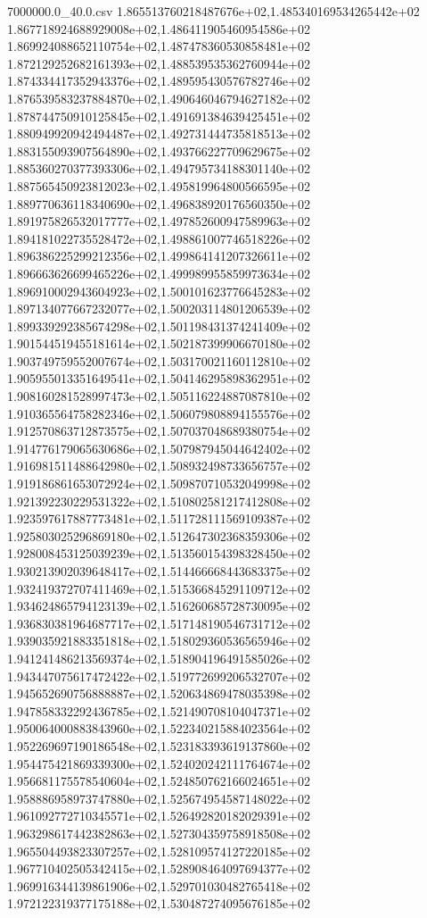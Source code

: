 \begin{filecontents*}{7000000.0_40.0.csv}
1.865513760218487676e+02,1.485340169534265442e+02
1.867718924688929008e+02,1.486411905460954586e+02
1.869924088652110754e+02,1.487478360530858481e+02
1.872129252682161393e+02,1.488539535362760944e+02
1.874334417352943376e+02,1.489595430576782746e+02
1.876539583237884870e+02,1.490646046794627182e+02
1.878744750910125845e+02,1.491691384639425451e+02
1.880949920942494487e+02,1.492731444735818513e+02
1.883155093907564890e+02,1.493766227709629675e+02
1.885360270377393306e+02,1.494795734188301140e+02
1.887565450923812023e+02,1.495819964800566595e+02
1.889770636118340690e+02,1.496838920176560350e+02
1.891975826532017777e+02,1.497852600947589963e+02
1.894181022735528472e+02,1.498861007746518226e+02
1.896386225299212356e+02,1.499864141207326611e+02
1.896663626699465226e+02,1.499989955859973634e+02
1.896910002943604923e+02,1.500101623776645283e+02
1.897134077667232077e+02,1.500203114801206539e+02
1.899339292385674298e+02,1.501198431374241409e+02
1.901544519455181614e+02,1.502187399906670180e+02
1.903749759552007674e+02,1.503170021160112810e+02
1.905955013351649541e+02,1.504146295898362951e+02
1.908160281528997473e+02,1.505116224887087810e+02
1.910365564758282346e+02,1.506079808894155576e+02
1.912570863712873575e+02,1.507037048689380754e+02
1.914776179065630686e+02,1.507987945044642402e+02
1.916981511488642980e+02,1.508932498733656757e+02
1.919186861653072924e+02,1.509870710532049998e+02
1.921392230229531322e+02,1.510802581217412808e+02
1.923597617887773481e+02,1.511728111569109387e+02
1.925803025296869180e+02,1.512647302368359306e+02
1.928008453125039239e+02,1.513560154398328450e+02
1.930213902039648417e+02,1.514466668443683375e+02
1.932419372707411469e+02,1.515366845291109712e+02
1.934624865794123139e+02,1.516260685728730095e+02
1.936830381964687717e+02,1.517148190546731712e+02
1.939035921883351818e+02,1.518029360536565946e+02
1.941241486213569374e+02,1.518904196491585026e+02
1.943447075617472422e+02,1.519772699206532707e+02
1.945652690756888887e+02,1.520634869478035398e+02
1.947858332292436785e+02,1.521490708104047371e+02
1.950064000883843960e+02,1.522340215884023564e+02
1.952269697190186548e+02,1.523183393619137860e+02
1.954475421869339300e+02,1.524020242111764674e+02
1.956681175578540604e+02,1.524850762166024651e+02
1.958886958973747880e+02,1.525674954587148022e+02
1.961092772710345571e+02,1.526492820182029391e+02
1.963298617442382863e+02,1.527304359758918508e+02
1.965504493823307257e+02,1.528109574127220185e+02
1.967710402505342415e+02,1.528908464097694377e+02
1.969916344139861906e+02,1.529701030482765418e+02
1.972122319377175188e+02,1.530487274095676185e+02

\end{filecontents*}
